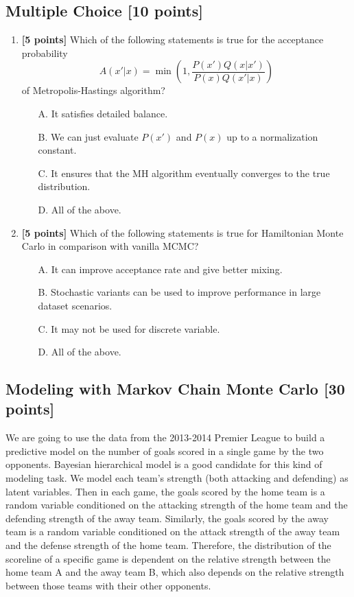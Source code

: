 \documentclass{article}
\begin{document}
\subsection{Multiple Choice [10 points]}
\begin{enumerate}
\item \textbf{[5 points]}
 Which of the following statements is true for the acceptance probability
$$
A(x'|x)=\min(1, \dfrac{P(x')Q(x|x')}{P(x)Q(x'|x)})
$$
of Metropolis-Hastings algorithm?
\begin{itemize}
	\item [A.] It satisfies detailed balance. 
	\item [B.] We can just evaluate $P(x')$ and $P(x)$ up to a normalization constant.
	\item [C.] It ensures that the MH algorithm eventually converges to the true distribution.
	\item [D.] All of the above. 
\end{itemize}

\item \textbf{[5 points]}
 Which of the following statements is true for Hamiltonian Monte Carlo in comparison with vanilla MCMC?
\begin{itemize}
	\item [A.] It can improve acceptance rate and give better mixing.
	\item [B.] Stochastic variants can be used to improve performance in large dataset scenarios. 
	\item [C.] It may not be used for discrete variable. 
	\item [D.] All of the above. 
\end{itemize}

\end{enumerate}



\subsection{Modeling with Markov Chain Monte Carlo [30 points]}
We are going to use the data from the 2013-2014 Premier League \cite{PL1314} to build a predictive model on the number of goals scored in a single game by the two opponents. Bayesian hierarchical model is a good candidate for this kind of modeling task. We model each team's strength (both attacking and defending) as latent variables. Then in each game, the goals scored by the home team is a random variable conditioned on the attacking strength of the home team and the defending strength of the away team. Similarly, the goals scored by the away team is a random variable conditioned on the attack strength of the away team and the defense strength of the home team. Therefore, the distribution of the scoreline of a specific game is dependent on the relative strength between the home team A and the away team B, which also depends on the relative strength between those teams with their other opponents. 
\end{document}
